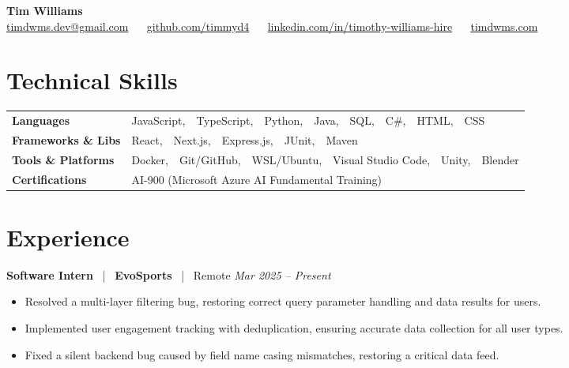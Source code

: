 \documentclass[10pt, letterpaper]{article}
\newcommand{\jobhead}[4]{%
  \vspace{5pt}%
  {\bfseries\color{dark}#1}%
  ~{\color{light}|}~%
  {\bfseries\color{navy}#2}%
  ~{\color{light}|}~%
  {\color{light}#3}%
  \hfill{\color{light}\small\textit{#4}}\\[-2pt]%
}
\newcommand{\skillrow}[2]{%
  {\bfseries #1} & #2 \\[2pt]%
}
\begin{document}

\begin{center}
  {\huge\bfseries\color{navy} Tim Williams}\\[4pt]
  {\small\color{light}
    \href{mailto:timdwms.dev@gmail.com}{timdwms.dev@gmail.com}
    ~\textbullet~
    \href{https://github.com/timmyd4}{github.com/timmyd4}
    ~\textbullet~
    \href{https://www.linkedin.com/in/timothy-williams-hire}{linkedin.com/in/timothy-williams-hire}
    ~\textbullet~
    \href{https://timdwms.com}{timdwms.com}
  }
\end{center}

\vspace{2pt}

\section{Technical Skills}

\begin{tabular}{@{}p{1.6in} p{5.2in}@{}}
  \skillrow{Languages}{JavaScript,\ \ TypeScript,\ \ Python,\ \ Java,\ \ SQL,\ \ C\#,\ \ HTML,\ \ CSS}
  \skillrow{Frameworks \& Libs}{React,\ \ Next.js,\ \ Express.js,\ \ JUnit,\ \ Maven}
  \skillrow{Tools \& Platforms}{Docker,\ \ Git/GitHub,\ \ WSL/Ubuntu,\ \ Visual Studio Code,\ \ Unity,\ \ Blender}
  \skillrow{Certifications}{AI-900 (Microsoft Azure AI Fundamental Training)}
\end{tabular}

\section{Experience}

\jobhead{Software Intern}{EvoSports}{Remote}{Mar 2025 – Present}
\begin{itemize}
  \item Resolved a multi-layer filtering bug, restoring correct query parameter handling and data results for users.
  \item Implemented user engagement tracking with deduplication, ensuring accurate data collection for all user types.
  \item Fixed a silent backend bug caused by field name casing mismatches, restoring a critical data feed.
\end{itemize}
\end{document}
